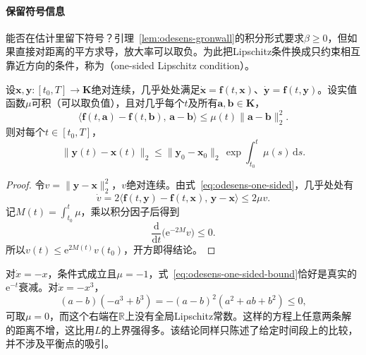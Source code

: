 \paragraph{保留符号信息}
能否在估计里留下符号？引理~\ref{lem:odesens-gronwall}的积分形式要求$\beta\geq0$，但如果直接对距离的平方求导，放大率可以取负。为此把Lipschitz条件换成只约束相互靠近方向的条件，称为（one-sided Lipschitz condition）。

\begin{lemma}[单侧Lipschitz估计]
\label{lem:odesens-one-sided}
设$\bm{x},\bm{y}:[t_0,T]\to\bm{K}$绝对连续，几乎处处满足$\dot{\bm{x}}=\bm{f}(t,\bm{x})$、$\dot{\bm{y}}=\bm{f}(t,\bm{y})$。设实值函数$\mu$可积（可以取负值），且对几乎每个$t$及所有$\bm{a},\bm{b}\in\bm{K}$，
\begin{equation}
 \bigl\langle\bm{f}(t,\bm{a})-\bm{f}(t,\bm{b}),\,\bm{a}-\bm{b}\bigr\rangle\leq\mu(t)\lVert\bm{a}-\bm{b}\rVert_2^2.
 \label{eq:odesens-one-sided}
\end{equation}
则对每个$t\in[t_0,T]$，
\begin{equation}
 \lVert\bm{y}(t)-\bm{x}(t)\rVert_2\leq\lVert\bm{y}_0-\bm{x}_0\rVert_2\,\exp\int_{t_0}^{t}\mu(s)\,\mathrm{d}s.
 \label{eq:odesens-one-sided-bound}
\end{equation}
\end{lemma}

\begin{proof}
令$v=\lVert\bm{y}-\bm{x}\rVert_2^2$，$v$绝对连续。由式~\eqref{eq:odesens-one-sided}，几乎处处有
\[
 \dot{v}=2\bigl\langle\bm{f}(t,\bm{y})-\bm{f}(t,\bm{x}),\,\bm{y}-\bm{x}\bigr\rangle\leq2\mu v.
\]
记$M(t)=\int_{t_0}^{t}\mu$，乘以积分因子后得到
\[
 \frac{\mathrm{d}}{\mathrm{d}t}\bigl(\mathrm{e}^{-2M}v\bigr)\leq0.
\]
所以$v(t)\leq\mathrm{e}^{2M(t)}v(t_0)$，开方即得结论。
\end{proof}

对$\dot{x}=-x$，条件式成立且$\mu=-1$，式~\eqref{eq:odesens-one-sided-bound}恰好是真实的$\mathrm{e}^{-t}$衰减。对$\dot{x}=-x^3$，
\[
 (a-b)(-a^3+b^3)=-(a-b)^2(a^2+ab+b^2)\leq0,
\]
可取$\mu=0$，而这个右端在$\mathbb{R}$上没有全局Lipschitz常数。这样的方程上任意两条解的距离不增，这比用$L$的上界强得多。该结论同样只陈述了给定时间段上的比较，并不涉及平衡点的吸引。
